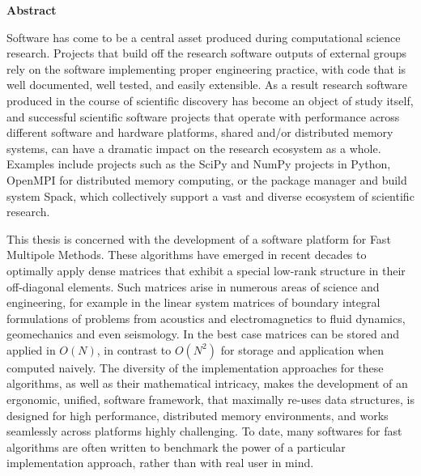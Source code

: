 \thispagestyle{plain}

\begin{center}
    \textbf{Abstract}
\end{center}

Software has come to be a central asset produced during
computational science research. Projects that build off the research software outputs of external groups rely on the software implementing proper engineering practice,
with code that is well documented, well tested, and easily extensible. As a
result research software produced in the course of scientific discovery has
become an object of study itself, and successful scientific software projects
that operate with performance across different software and hardware platforms,
shared and/or distributed memory systems, can have a dramatic impact on the
research ecosystem as a whole. Examples include projects such as the SciPy and
NumPy projects in Python, OpenMPI for distributed memory computing, or the package
manager and build system Spack, which collectively support a vast and diverse ecosystem of scientific
research.

This thesis is concerned with the development of a software platform
for Fast Multipole Methods. These algorithms have emerged in recent decades to
optimally apply dense matrices that exhibit
a special low-rank structure in their off-diagonal elements. Such matrices arise
in numerous areas of science and engineering, for example in the linear system
matrices of boundary integral formulations of problems from acoustics and
electromagnetics to fluid dynamics, geomechanics and even seismology. In the
best case matrices can be stored and applied in $O(N)$, in contrast
to $O(N^2)$ for storage and application when computed
naively. The diversity of the implementation approaches for these algorithms, as
well as their mathematical intricacy, makes the development of an ergonomic,
unified, software framework, that maximally re-uses data structures, is designed
for high performance, distributed memory environments, and works seamlessly
across platforms highly challenging. To date, many softwares for fast algorithms
are often written to benchmark the power of a particular implementation approach,
rather than with real user in mind.

